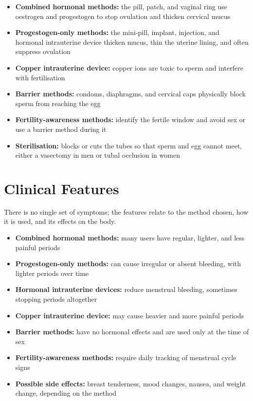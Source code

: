 \begin{itemize}
    \item \textbf{Combined hormonal methods:} the pill, patch, and vaginal ring use oestrogen and progestogen to stop ovulation and thicken cervical mucus
    \item \textbf{Progestogen-only methods:} the mini-pill, implant, injection, and hormonal intrauterine device thicken mucus, thin the uterine lining, and often suppress ovulation
    \item \textbf{Copper intrauterine device:} copper ions are toxic to sperm and interfere with fertilisation
    \item \textbf{Barrier methods:} condoms, diaphragms, and cervical caps physically block sperm from reaching the egg
    \item \textbf{Fertility-awareness methods:} identify the fertile window and avoid sex or use a barrier method during it
    \item \textbf{Sterilisation:} blocks or cuts the tubes so that sperm and egg cannot meet, either a vasectomy in men or tubal occlusion in women
\end{itemize}

\section*{Clinical Features}
There is no single set of symptoms; the features relate to the method chosen, how it is used, and its effects on the body.

\begin{itemize}
    \item \textbf{Combined hormonal methods:} many users have regular, lighter, and less painful periods
    \item \textbf{Progestogen-only methods:} can cause irregular or absent bleeding, with lighter periods over time
    \item \textbf{Hormonal intrauterine devices:} reduce menstrual bleeding, sometimes stopping periods altogether
    \item \textbf{Copper intrauterine device:} may cause heavier and more painful periods
    \item \textbf{Barrier methods:} have no hormonal effects and are used only at the time of sex
    \item \textbf{Fertility-awareness methods:} require daily tracking of menstrual cycle signs
    \item \textbf{Possible side effects:} breast tenderness, mood changes, nausea, and weight change, depending on the method
\end{itemize}

